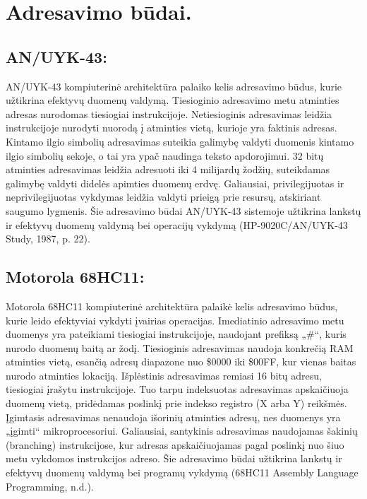 \documentclass[a4paper,12pt]{article}
\begin{document}
\section{Adresavimo būdai.}
\subsection{AN/UYK-43:}
AN/UYK-43 kompiuterinė architektūra palaiko kelis adresavimo būdus, kurie užtikrina efektyvų duomenų valdymą. Tiesioginio adresavimo metu atminties adresas nurodomas tiesiogiai instrukcijoje. Netiesioginis adresavimas leidžia instrukcijoje nurodyti nuorodą į atminties vietą, kurioje yra faktinis adresas. Kintamo ilgio simbolių adresavimas suteikia galimybę valdyti duomenis kintamo ilgio simbolių sekoje, o tai yra ypač naudinga teksto apdorojimui. 32 bitų atminties adresavimas leidžia adresuoti iki 4 milijardų žodžių, suteikdamas galimybę valdyti didelės apimties duomenų erdvę. Galiausiai, privilegijuotas ir neprivilegijuotas vykdymas leidžia valdyti prieigą prie resursų, atskiriant saugumo lygmenis. Šie adresavimo būdai AN/UYK-43 sistemoje užtikrina lankstų ir efektyvų duomenų valdymą bei operacijų vykdymą (HP-9020C/AN/UYK-43 Study, 1987, p. 22).
\subsection{Motorola 68HC11:}
Motorola 68HC11 kompiuterinė architektūra palaikė kelis adresavimo būdus, kurie leido efektyviai vykdyti įvairias operacijas. Imediatinio adresavimo metu duomenys yra pateikiami tiesiogiai instrukcijoje, naudojant prefiksą „\#“, kuris nurodo duomenų baitą ar žodį. Tiesioginis adresavimas naudoja konkrečią RAM atminties vietą, esančią adresų diapazone nuo \$0000 iki \$00FF, kur vienas baitas nurodo atminties lokaciją. Išplėstinis adresavimas remiasi 16 bitų adresu, tiesiogiai įrašytu instrukcijoje. Tuo tarpu indeksuotas adresavimas apskaičiuoja duomenų vietą, pridėdamas poslinkį prie indekso registro (X arba Y) reikšmės. Įgimtasis adresavimas nenaudoja išorinių atminties adresų, nes duomenys yra „įgimti“ mikroprocesoriui. Galiausiai, santykinis adresavimas naudojamas šakinių (branching) instrukcijose, kur adresas apskaičiuojamas pagal poslinkį nuo šiuo metu vykdomos instrukcijos adreso. Šie adresavimo būdai užtikrina lankstų ir efektyvų duomenų valdymą bei programų vykdymą (68HC11 Assembly Language Programming, n.d.).
\end{document}
